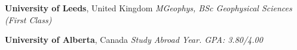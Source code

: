 %
\textbf{University of Leeds}, United Kingdom \newline
\textit{MGeophys, BSc Geophysical Sciences (First Class)} 

\medskip
\textbf{University of Alberta}, Canada \newline
\textit{Study Abroad Year. GPA\@: 3.80/4.00} 

\bigskip

